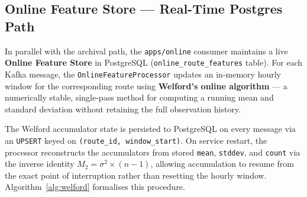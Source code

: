   \subsection{Online Feature Store — Real-Time Postgres Path}                                                                                             
  \label{subsec:online}
   
  In parallel with the archival path, the \texttt{apps/online} consumer                                                                                   
  maintains a live \textbf{Online Feature Store} in PostgreSQL
  (\texttt{online\_route\_features} table). For each Kafka message,                                                                                       
  the \texttt{OnlineFeatureProcessor} updates an in-memory hourly window                                                                                  
  for the corresponding route using \textbf{Welford's online algorithm}                                                                                   
  \cite{welford1962} — a numerically stable, single-pass method for                                                                                       
  computing a running mean and standard deviation without retaining the                                                                                   
  full observation history.                                                                                                                               
                                                                                                                                                          
  The Welford accumulator state is persisted to PostgreSQL on every                                                                                       
  message via an \texttt{UPSERT} keyed on \texttt{(route\_id, window\_start)}.
  On service restart, the processor reconstructs the accumulators from                                                                                    
  stored \texttt{mean}, \texttt{stddev}, and \texttt{count} via the
  inverse identity $M_2 = \sigma^2 \times (n-1)$, allowing accumulation                                                                                   
  to resume from the exact point of interruption rather than resetting                                                                                    
  the hourly window. Algorithm~\ref{alg:welford} formalises this procedure.                                                                               
                                                                                                                                                          
